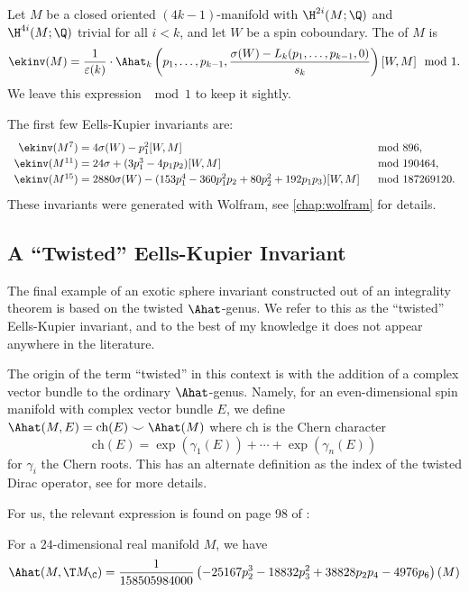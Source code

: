 \begin{definition}
	Let $M$ be a closed oriented $(4k-1)$-manifold with $\H^{2i}(M;\Q)$ and $\H^{4i}(M;\Q)$ trivial for all $i<k$, and let $W$ be a spin coboundary. The  of $M$ is
	\[
		\ekinv(M) = \frac{1}{\varepsilon(k)}\cdot \Ahat_k\left(p_1, \ldots, p_{k-1}, \frac{\sigma(W)-L_k(p_1,\ldots, p_{k-1},0)}{s_k}\right)[W,M]\mod 1.
	\]
	We leave this expression $\mod 1$ to keep it sightly.
\end{definition}

\begin{example}
	The first few Eells-Kupier invariants are:
	\[
		\renewcommand{\arraystretch}{1.2}
		\begin{array}{r@{\;}ll}
			\ekinv(M^7)
			 & = 4\sigma(W) - p_1^2[W, M]
			 & \mod 896,                                                        \\
			\ekinv(M^{11})
			 & = 24\sigma + (3p_1^3-4p_1p_2)[W,M]
			 & \mod 190464,                                                       \\
			\ekinv(M^{15})
			 & = 2880\sigma(W) - (153p_1^4-360p_1^2p_2+80p_2^2+192p_1p_3)[W,M]
			 & \mod 187269120.
		\end{array}
	\]
	These invariants were generated with Wolfram, see \cref{chap:wolfram} for details.
\end{example}

\subsection{A ``Twisted'' Eells-Kupier Invariant}

The final example of an exotic sphere invariant constructed out of an integrality theorem is based on the twisted $\Ahat$-genus. We refer to this as the ``twisted'' Eells-Kupier invariant, and to the best of my knowledge it does not appear anywhere in the literature.

The origin of the term ``twisted'' in this context is with the addition of a complex vector bundle to the ordinary $\Ahat$-genus. Namely, for an even-dimensional spin manifold with complex vector bundle $E$, we define $\Ahat(M, E) = \textrm{ch}(E)\smile \Ahat(M)$ where $\textrm{ch}$ is the Chern character 
\[
		\textrm{ch}(E) = \exp(\gamma_1(E))+\cdots +\exp(\gamma_n(E))
\]
for $\gamma_i$ the Chern roots. This has an alternate definition as the index of the twisted Dirac operator, see  for more details.

For us, the relevant expression is found on page 98 of \cite{hopkinsmahowald2002bo8}:
\begin{proposition}
	For a $24$-dimensional real manifold $M$, we have
	\[
		\Ahat(M,\T M_\C) = \frac{1}{158505984000}\left(-25167p_2^3 - 18832p_3^2 + 38828p_2p_4 - 4976p_6\right)(M)
	\]
\end{proposition}

